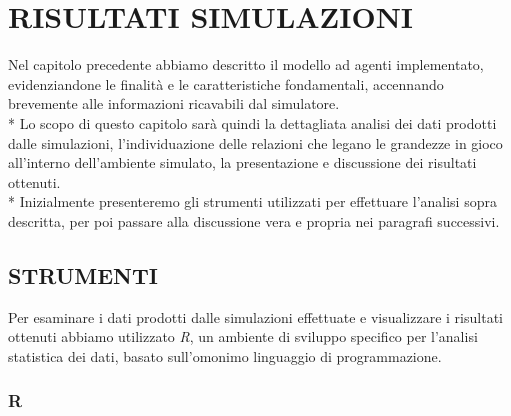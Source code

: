\documentclass[12pt,a4paper,openright,twoside]{report}
\begin{document}
\chapter{RISULTATI SIMULAZIONI}

Nel capitolo precedente abbiamo descritto il modello ad agenti implementato, evidenziandone le finalità e le caratteristiche fondamentali, accennando brevemente alle informazioni ricavabili dal simulatore.\\*
Lo scopo di questo capitolo sarà quindi la dettagliata analisi dei dati prodotti dalle simulazioni, l'individuazione delle relazioni che legano le grandezze in gioco all'interno dell'ambiente simulato, la presentazione e discussione dei risultati ottenuti.\\*
Inizialmente presenteremo gli strumenti utilizzati per effettuare l'analisi sopra descritta, per poi passare alla discussione vera e propria nei paragrafi successivi.

\section{STRUMENTI}
Per esaminare i dati prodotti dalle simulazioni effettuate e visualizzare i risultati ottenuti abbiamo utilizzato \emph{R}, un ambiente di sviluppo specifico per l'analisi statistica dei dati, basato sull'omonimo linguaggio di programmazione.

\subsection{R}
\end{document}
